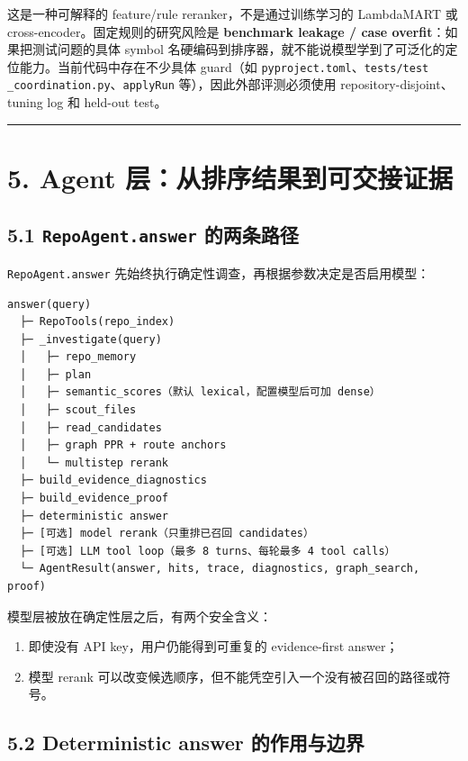 \documentclass[UTF8,12pt,openany]{ctexbook}
\begin{document}
这是一种可解释的 feature/rule reranker，不是通过训练学习的 LambdaMART 或 cross-encoder。固定规则的研究风险是 \textbf{benchmark leakage / case overfit}：如果把测试问题的具体 symbol 名硬编码到排序器，就不能说模型学到了可泛化的定位能力。当前代码中存在不少具体 guard（如 \texttt{pyproject.toml}、\texttt{tests/test\\_coordination.py}、\texttt{applyRun} 等），因此外部评测必须使用 repository-disjoint、tuning log 和 held-out test。\par

\hrule

\section{5. Agent 层：从排序结果到可交接证据}

\subsection{5.1 \texttt{RepoAgent.answer} 的两条路径}

\texttt{RepoAgent.answer} 先始终执行确定性调查，再根据参数决定是否启用模型：\par

\begin{lstlisting}
answer(query)
  ├─ RepoTools(repo_index)
  ├─ _investigate(query)
  │   ├─ repo_memory
  │   ├─ plan
  │   ├─ semantic_scores（默认 lexical，配置模型后可加 dense）
  │   ├─ scout_files
  │   ├─ read_candidates
  │   ├─ graph PPR + route anchors
  │   └─ multistep rerank
  ├─ build_evidence_diagnostics
  ├─ build_evidence_proof
  ├─ deterministic answer
  ├─ [可选] model rerank（只重排已召回 candidates）
  ├─ [可选] LLM tool loop（最多 8 turns、每轮最多 4 tool calls）
  └─ AgentResult(answer, hits, trace, diagnostics, graph_search, proof)
\end{lstlisting}

模型层被放在确定性层之后，有两个安全含义：\par

\begin{enumerate}
\item 即使没有 API key，用户仍能得到可重复的 evidence-first answer；
\item 模型 rerank 可以改变候选顺序，但不能凭空引入一个没有被召回的路径或符号。
\end{enumerate}

\subsection{5.2 Deterministic answer 的作用与边界}
\end{document}
